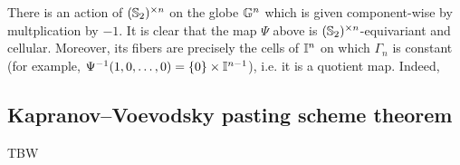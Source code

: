 There is an action of $(\mathbb{S}_2)^{\times n}$ on the globe $\mathbb{G}^n$ which is given component-wise by multplication by $-1$. 
It is clear that the map $\Psi$ above is $(\mathbb{S}_2)^{\times n}$-equivariant and cellular. 
Moreover, its fibers are precisely the cells of $\mathbb{I}^n$ on which $\Gamma_n$ is constant (for example, $\Psi^{-1}(1,0,\ldots,0)=\{0\} \times \mathbb{I}^{n-1}$), i.e. it is a quotient map. 
Indeed, 

\subsection{Kapranov--Voevodsky pasting scheme theorem}

TBW